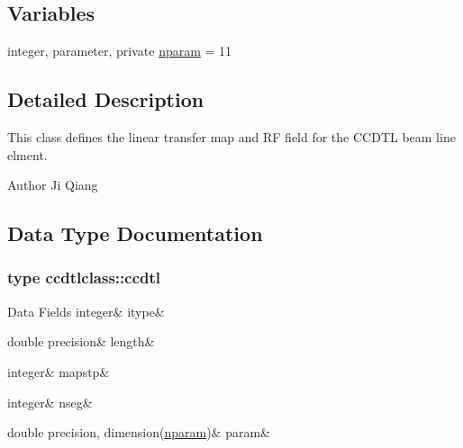 \subsection*{Variables}
\begin{DoxyCompactItemize}
\item 
integer, parameter, private \mbox{\hyperlink{namespaceccdtlclass_a0e8e95c86f2dab6639fc79f05859b6ea}{nparam}} = 11
\end{DoxyCompactItemize}


\subsection{Detailed Description}
This class defines the linear transfer map and RF field for the C\+C\+D\+TL beam line elment. 

\begin{DoxyAuthor}{Author}
Ji Qiang 
\end{DoxyAuthor}


\subsection{Data Type Documentation}
\label{structccdtlclass_1_1ccdtl}
\subsubsection{type ccdtlclass\+::ccdtl}
\begin{DoxyFields}{Data Fields}
\mbox{\label{namespaceccdtlclass_aea542f9975283b5fd43c8f15a0d2762f}} 
integer&
itype&
\\
\hline

\mbox{\label{namespaceccdtlclass_a367acb3cd3326d78cf47fe5c8891b80c}} 
double precision&
length&
\\
\hline

\mbox{\label{namespaceccdtlclass_a646c337f17e8c188638d58449ea92b99}} 
integer&
mapstp&
\\
\hline

\mbox{\label{namespaceccdtlclass_a56759205b010998a69c2716e35e0d6d6}} 
integer&
nseg&
\\
\hline

\mbox{\label{namespaceccdtlclass_a6b125e6ca6440736ab2272ad373cc24d}} 
double precision, dimension(\mbox{\hyperlink{namespaceccdtlclass_a0e8e95c86f2dab6639fc79f05859b6ea}{nparam}})&
param&
\\
\hline

\end{DoxyFields}


